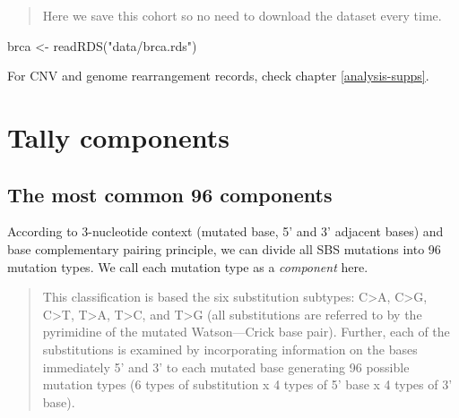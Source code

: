 \documentclass[
  12pt,
  a4paper,
  twoside]{book}
\newenvironment{Shaded}{\begin{snugshade}}{\end{snugshade}}
\newcommand{\FunctionTok}[1]{\textcolor[rgb]{0.00,0.00,0.00}{#1}}
\newcommand{\NormalTok}[1]{#1}
\newcommand{\OtherTok}[1]{\textcolor[rgb]{0.56,0.35,0.01}{#1}}
\newcommand{\StringTok}[1]{\textcolor[rgb]{0.31,0.60,0.02}{#1}}
\begin{document}
\begin{quote}
Here we save this cohort so no need to download the dataset every time.
\end{quote}

\begin{Shaded}
\begin{Highlighting}[]
\NormalTok{brca }\OtherTok{\textless{}{-}} \FunctionTok{readRDS}\NormalTok{(}\StringTok{"data/brca.rds"}\NormalTok{)}
\end{Highlighting}
\end{Shaded}

For CNV and genome rearrangement records, check chapter \ref{analysis-supps}.

\hypertarget{tally-components}{%
\section{Tally components}\label{tally-components}}

\hypertarget{the-most-common-96-components}{%
\subsection{The most common 96 components}\label{the-most-common-96-components}}

According to 3-nucleotide context (mutated base, 5' and 3' adjacent bases) and base complementary pairing principle, we can divide all SBS mutations into 96 mutation types. We call each mutation type as a \emph{component} here.

\begin{quote}
This classification is based the six substitution subtypes: C\textgreater A, C\textgreater G, C\textgreater T, T\textgreater A, T\textgreater C, and T\textgreater G (all substitutions are referred to by the pyrimidine of the mutated Watson---Crick base pair). Further, each of the substitutions is examined by incorporating information on the bases immediately 5' and 3' to each mutated base generating 96 possible mutation types (6 types of substitution x 4 types of 5' base x 4 types of 3' base).
\end{quote}
\end{document}
